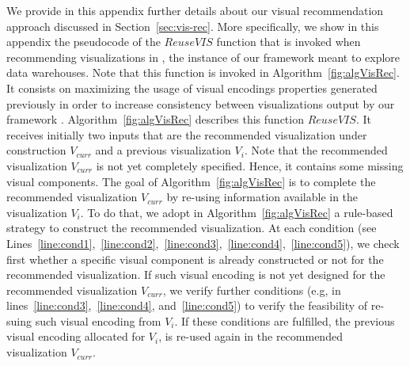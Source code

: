 We provide in this appendix further details about our visual recommendation approach discussed in Section~\ref{sec:vis-rec}.
More specifically, we show in this appendix the pseudocode of the $ReuseVIS$ function that is invoked when recommending visualizations in \prototype{}, the instance of our framework meant  to explore data warehouses.
Note that this function is invoked in Algorithm~\ref{fig:algVisRec}. It consists on maximizing the usage of visual encodings properties generated previously in order to increase consistency between visualizations output by our framework \framework{}.
Algorithm~\ref{fig:algVisRec} describes this function $ReuseVIS$.
It receives initially two inputs that are the recommended visualization under construction $V_{curr}$ and a previous visualization $V_i$. 
Note that the recommended visualization $V_{curr}$ is not yet completely specified. Hence, it contains some missing visual components.
The goal of Algorithm~\ref{fig:algVisRec} is to complete the recommended visualization $V_{curr}$ by re-using information available in the visualization $V_i$.
To do that, we adopt in Algorithm~\ref{fig:algVisRec} a rule-based strategy to construct the recommended visualization.
At each condition (see Lines~\ref{line:cond1},~\ref{line:cond2},~\ref{line:cond3},~\ref{line:cond4},~\ref{line:cond5}), we check first whether a specific visual component is already constructed or not for the recommended visualization.
If such visual encoding is not yet designed for the recommended visualization $V_{curr}$, we verify further conditions (e.g, in lines~\ref{line:cond3},~\ref{line:cond4}, and~\ref{line:cond5}) to verify the feasibility of re-suing such visual encoding from $V_i$.
If these conditions are fulfilled, the previous visual encoding allocated for $V_i$, is re-used again in the recommended visualization $V_{curr}$.


